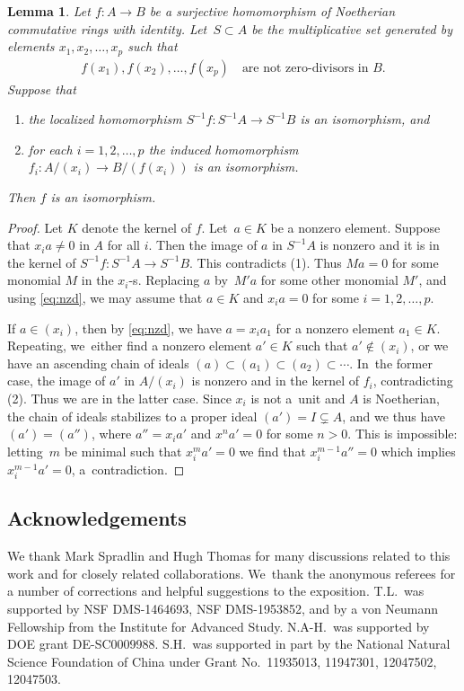 \documentclass[pdftex]{sigma}%
\numberwithin{equation}{section}
\newtheorem{Lemma}[Theorem]{Lemma}
\begin{document}
\begin{Lemma}\label{lem:ringiso}
Let $f\colon A \to B$ be a surjective homomorphism of Noetherian commutative rings with identity. Let~$S \subset A$ be the multiplicative set generated by elements $x_1,x_2,\dots,x_p$ such that
\begin{gather}\label{eq:nzd}
f(x_1),f(x_2),\dots,f(x_p)\quad \text{are not zero-divisors in $B$}.
\end{gather}
Suppose that
\begin{enumerate}\itemsep=0pt
\item[$(1)$]
the localized homomorphism $S^{-1} f\colon S^{-1}A \to S^{-1}B$ is an isomorphism, and
\item[$(2)$]
for each $i=1,2,\dots,p$ the induced homomorphism $f_i\colon A/(x_i) \to B/(f(x_i))$ is an isomorphism.
\end{enumerate}
Then $f$ is an isomorphism.
\end{Lemma}
\begin{proof}
Let $K$ denote the kernel of $f$. Let~$a \in K$ be a nonzero element. Suppose that $x_i a \neq 0$ in $A$ for all $i$. Then the image of $a$ in $S^{-1}A$ is nonzero and it is in the kernel of $S^{-1} f\colon S^{-1}A \allowbreak\to S^{-1}B$. This contradicts (1). Thus $M a = 0$ for some monomial $M$ in the $x_i$-s. Replacing $a$ by~$M'a$ for some other monomial $M'$, and using \eqref{eq:nzd}, we may assume that $a \in K$ and $x_ia=0$ for some $i =1,2,\dots,p$.

If $a \in (x_i)$, then by \eqref{eq:nzd}, we have $a = x_i a_1$ for a nonzero element $a_1 \in K$. Repeating, we~either find a nonzero element $a' \in K$ such that $a' \notin (x_i)$, or we have an ascending chain of ideals $(a) \subset (a_1) \subset (a_2) \subset \cdots$. In~the former case, the image of $a'$ in $A/(x_i)$ is nonzero and in the kernel of $f_i$, contradicting (2). Thus we are in the latter case. Since $x_i$ is not a~unit and $A$ is Noetherian, the chain of ideals stabilizes to a proper ideal $(a') = I \subsetneq A$, and we thus have $(a') = (a'')$, where $a'' = x_i a'$ and $x^n a' = 0$ for some $n > 0$. This is impossible: letting~$m$ be minimal such that $x_i^m a' = 0$ we find that $x_i^{m-1} a'' =0$ which implies $x_i^{m-1} a' = 0$, a~contradiction.
\end{proof}

\subsection*{Acknowledgements} We thank Mark Spradlin and Hugh Thomas for many discussions related to this work and for closely related collaborations. We~thank the anonymous referees for a number of corrections and helpful suggestions to the exposition. T.L.\ was supported
by NSF DMS-1464693, NSF DMS-1953852, and by a von Neumann Fellowship from the Institute for Advanced Study.
N.A-H.\ was supported by DOE grant DE-SC0009988. S.H.\ was supported in part by the National Natural Science Foundation of China under Grant No.\ 11935013, 11947301, 12047502, 12047503.
\end{document}
